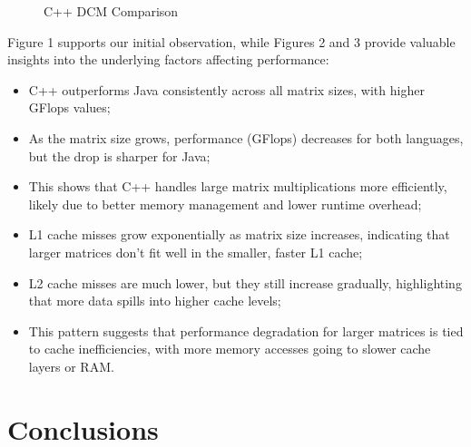 \documentclass{article}
\begin{document}
\begin{figure}[H]
\begin{minipage}{0.32\textwidth}
        \caption{\small C++ DCM Comparison}
        \label{fig:cache_misses}
    \end{minipage}
\end{figure}

Figure 1 supports our initial observation, while Figures 2 and 3 provide valuable insights into the underlying factors affecting performance:

\begin{itemize}
    \item C++ outperforms Java consistently across all matrix sizes, with higher GFlops values;
    \item As the matrix size grows, performance (GFlops) decreases for both languages, but the drop is sharper for Java;
    \item This shows that C++ handles large matrix multiplications more efficiently, likely due to better memory management and lower runtime overhead;
    \item L1 cache misses grow exponentially as matrix size increases, indicating that larger matrices don't fit well in the smaller, faster L1 cache;
    \item L2 cache misses are much lower, but they still increase gradually, highlighting that more data spills into higher cache levels;
    \item This pattern suggests that performance degradation for larger matrices is tied to cache inefficiencies, with more memory accesses going to slower cache layers or RAM.
\end{itemize}


\section{Conclusions}
\end{document}
